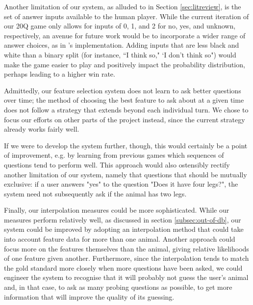 \documentclass[11pt,a4paper]{article}
\begin{document}
{Another limitation of our system, as alluded to in Section \ref{sec:litreview}, is the set of answer inputs available to the human player. While the current iteration of our 20Q game only allows for inputs of 0, 1, and 2 for no, yes, and unknown, respectively, an avenue for future work would be to incorporate a wider range of answer choices, as in \citet{Burgener2006}'s implementation. Adding inputs that are less black and white than a binary split (for instance, ``I think so," `I don't think so") would make the game easier to play and positively impact the probability distribution, perhaps leading to a higher win rate. 

Admittedly, our feature selection system does not learn to ask better questions over time; the method of choosing the best feature to ask about at a given time does not follow a strategy that extends beyond each individual turn. We chose to focus our efforts on other parts of the project instead, since the current strategy already works fairly well.

If we were to develop the system further, though, this would certainly be a point of improvement, e.g. by learning from previous games which sequences of questions tend to perform well. This approach would also ostensibly rectify another limitation of our system, namely that questions that should be mutually exclusive: if a user answers "yes" to the question "Does it have four legs?", the system need not subsequently ask if the animal has two legs. 

Finally, our interpolation measures could be more sophisticated. While our measures perform relatively well, as discussed in section \ref{subsec:out-of-db}, our system could be improved by adopting an interpolation method that could take into account feature data for more than one animal. 
Another approach could focus more on the features themselves than the animal, giving relative likelihoods of one feature given another.
Furthermore, since the interpolation tends to match the gold standard more closely when more questions have been asked, we could engineer the system to recognise that it will probably not guess the user's animal and, in that case, to ask as many probing questions as possible, to get more information that will improve the quality of its guessing.


}
\end{document}
